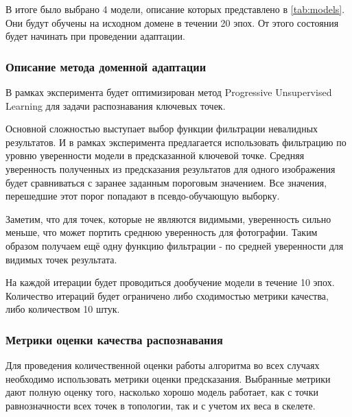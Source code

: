 В итоге было выбрано 4 модели, описание которых представлено в \autoref{tab:models}. Они будут обучены на исходном домене в течении 20 эпох. От этого состояния будет начинать при проведении адаптации.

\subsubsection*{Описание метода доменной адаптации}

В рамках эксперимента будет оптимизирован метод Progressive Unsupervised Learning \cite{pul} для задачи распознавания ключевых точек. 

Основной сложностью выступает выбор функции фильтрации невалидных результатов. И в рамках эксперимента предлагается использовать фильтрацию по уровню уверенности модели в предсказанной ключевой точке. Средняя уверенность полученных из предсказания результатов для одного изображения будет сравниваться с заранее заданным пороговым значением. Все значения, перешедшие этот порог попадают в псевдо-обучающую выборку.

Заметим, что для точек, которые не являются видимыми, уверенность сильно меньше, что может портить среднюю уверенность для фотографии. Таким образом получаем ещё одну функцию фильтрации - по средней уверенности для видимых точек результата.

На каждой итерации будет проводиться дообучение модели в течение 10 эпох. Количество итераций будет ограничено либо сходимостью метрики качества, либо количеством 10 штук.

\subsubsection*{Метрики оценки качества распознавания}

Для проведения количественной оценки работы алгоритма во всех случаях необходимо использовать метрики оценки предсказания. Выбранные метрики дают полную оценку того, насколько хорошо модель работает, как с точки равнозначности всех точек в топологии, так и с учетом их веса в скелете.\\

